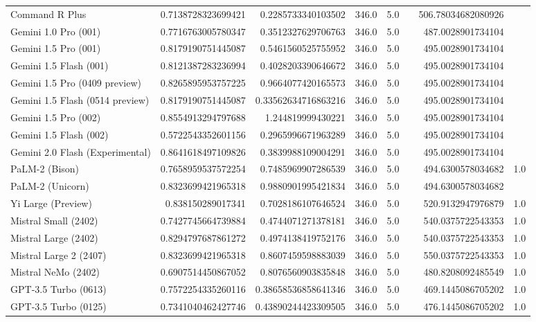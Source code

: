 \begin{table}[htp]
{\begin{tabular}{lrrrrrrr}
Command R Plus & 0.7138728323699421 & 0.2285733340103502 & 346.0 & 5.0 &  & 506.78034682080926 &  \\
Gemini 1.0 Pro (001) & 0.7716763005780347 & 0.3512327629706763 & 346.0 & 5.0 &  & 487.0028901734104 &  \\
Gemini 1.5 Pro (001) & 0.8179190751445087 & 0.5461560525755952 & 346.0 & 5.0 &  & 495.0028901734104 &  \\
Gemini 1.5 Flash (001) & 0.8121387283236994 & 0.4028203390646672 & 346.0 & 5.0 &  & 495.0028901734104 &  \\
Gemini 1.5 Pro (0409 preview) & 0.8265895953757225 & 0.9664077420165573 & 346.0 & 5.0 &  & 495.0028901734104 &  \\
Gemini 1.5 Flash (0514 preview) & 0.8179190751445087 & 0.33562634716863216 & 346.0 & 5.0 &  & 495.0028901734104 &  \\
Gemini 1.5 Pro (002) & 0.8554913294797688 & 1.244819999430221 & 346.0 & 5.0 &  & 495.0028901734104 &  \\
Gemini 1.5 Flash (002) & 0.5722543352601156 & 0.2965996671963289 & 346.0 & 5.0 &  & 495.0028901734104 &  \\
Gemini 2.0 Flash (Experimental) & 0.8641618497109826 & 0.3839988109004291 & 346.0 & 5.0 &  & 495.0028901734104 &  \\
PaLM-2 (Bison) & 0.7658959537572254 & 0.7485969907286539 & 346.0 & 5.0 &  & 494.6300578034682 & 1.0 \\
PaLM-2 (Unicorn) & 0.8323699421965318 & 0.9880901995421834 & 346.0 & 5.0 &  & 494.6300578034682 &  \\
Yi Large (Preview) & 0.838150289017341 & 0.7028186107646524 & 346.0 & 5.0 &  & 520.9132947976879 & 1.0 \\
Mistral Small (2402) & 0.7427745664739884 & 0.4744071271378181 & 346.0 & 5.0 &  & 540.0375722543353 & 1.0 \\
Mistral Large (2402) & 0.8294797687861272 & 0.4974138419752176 & 346.0 & 5.0 &  & 540.0375722543353 & 1.0 \\
Mistral Large 2 (2407) & 0.8323699421965318 & 0.8607459598883039 & 346.0 & 5.0 &  & 550.0375722543353 & 1.0 \\
Mistral NeMo (2402) & 0.6907514450867052 & 0.8076560903835848 & 346.0 & 5.0 &  & 480.8208092485549 & 1.0 \\
GPT-3.5 Turbo (0613) & 0.7572254335260116 & 0.38658536858641346 & 346.0 & 5.0 &  & 469.1445086705202 & 1.0 \\
GPT-3.5 Turbo (0125) & 0.7341040462427746 & 0.43890244423309505 & 346.0 & 5.0 &  & 476.1445086705202 & 1.0 \\

\end{tabular}}
\end{table}
